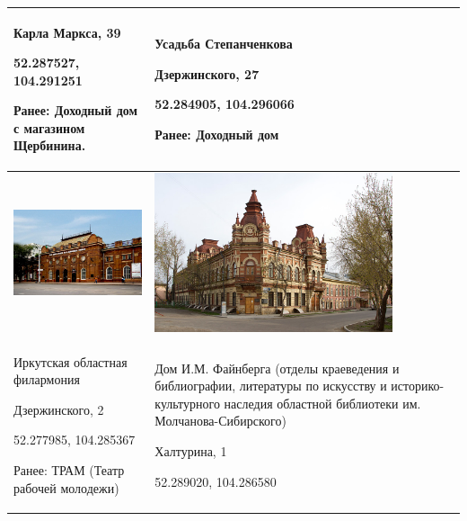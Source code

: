 \begin{supertabular}[c]{@{}|p{8cm}|p{8cm}|@{}}
    Карла Маркса, 39 

    52.287527, 104.291251

    Ранее: Доходный дом с магазином Щербинина. & Усадьба Степанченкова 

    Дзержинского, 27 

    52.284905, 104.296066

    Ранее: Доходный дом  \\
    \hline
    \includegraphics[width=7cm]{6} & \includegraphics[width=7cm]{7} \\
    \hline
    Иркутская областная филармония 
    
    Дзержинского, 2 
    
    52.277985, 104.285367
    
    Ранее: ТРАМ (Театр рабочей молодежи) & Дом И.М. Файнберга  (отделы краеведения и библиографии, литературы по искусству и историко-культурного наследия областной библиотеки им. Молчанова-Сибирского)

    Халтурина, 1 

    52.289020, 104.286580


\end{supertabular}
